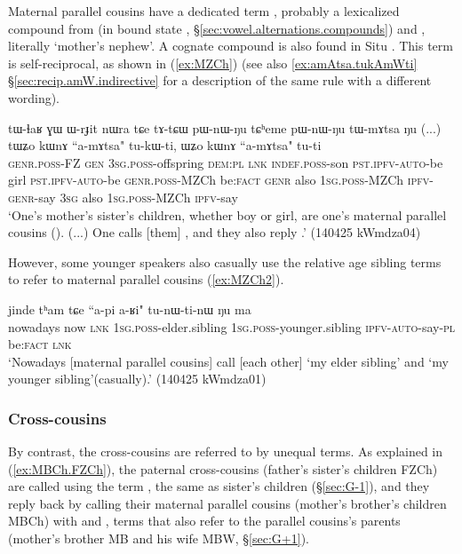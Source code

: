 Maternal parallel cousins have a dedicated term , probably a lexicalized compound from  (in bound state , §\ref{sec:vowel.alternations.compounds}) and , literally `mother's nephew'. A cognate compound is also found in Situ \citep{zhangsy20kinship}. This term is self-reciprocal, as shown in (\ref{ex:MZCh}) (see also \ref{ex:amAtsa.tukAmWti} §\ref{sec:recip.amW.indirective} for a description of the same rule with a different wording).

\begin{exe}
\ex \label{ex:MZCh}
\gll tɯ-ɬaʁ ɣɯ ɯ-rɟit nɯra tɕe tɤ-tɕɯ pɯ-nɯ-ŋu tɕʰeme pɯ-nɯ-ŋu tɯ-mɤtsa ŋu (...) tɯʑo kɯnɤ ``a-mɤtsa" tu-kɯ-ti, ɯʑo kɯnɤ ``a-mɤtsa" tu-ti \\
\textsc{genr}.\textsc{poss}-FZ \textsc{gen} \textsc{3sg}.\textsc{poss}-offspring \textsc{dem}:\textsc{pl} \textsc{lnk} \textsc{indef}.\textsc{poss}-son \textsc{pst}.\textsc{ipfv}-\textsc{auto}-be girl \textsc{pst}.\textsc{ipfv}-\textsc{auto}-be \textsc{genr}.\textsc{poss}-MZCh be:\textsc{fact} {  } \textsc{genr} also \textsc{1sg}.\textsc{poss}-MZCh \textsc{ipfv}-\textsc{genr}-say \textsc{3sg} also \textsc{1sg}.\textsc{poss}-MZCh \textsc{ipfv}-say \\
\glt `One's mother's sister's children, whether boy or girl, are one's maternal parallel cousins (). (...) One calls [them] , and they also reply .' (140425 kWmdza04)
\end{exe}

However, some younger speakers also casually use the relative age sibling terms to refer to maternal parallel cousins (\ref{ex:MZCh2}). 

\begin{exe}
\ex \label{ex:MZCh2}
\gll jinde tʰam tɕe ``a-pi a-ʁi" tu-nɯ-ti-nɯ ŋu ma  \\
nowadays now \textsc{lnk} \textsc{1sg}.\textsc{poss}-elder.sibling \textsc{1sg}.\textsc{poss}-younger.sibling \textsc{ipfv}-\textsc{auto}-say-\textsc{pl} be:\textsc{fact} \textsc{lnk} \\
\glt `Nowadays [maternal parallel cousins] call [each other]  `my elder sibling' and   `my younger sibling'(casually).' (140425 kWmdza01)
\end{exe}


\subsubsection{Cross-cousins} \label{sec:ego.cross.cousins}
By contrast, the cross-cousins are referred to by unequal terms. As explained in (\ref{ex:MBCh.FZCh}), the paternal cross-cousins (father's sister's children FZCh) are called using the term , the same as sister's children (§\ref{sec:G-1}), and they reply back by calling their maternal parallel cousins (mother's brother's children MBCh) with  and , terms that also refer to the parallel cousins's parents (mother's brother MB and his wife MBW, §\ref{sec:G+1}). 

